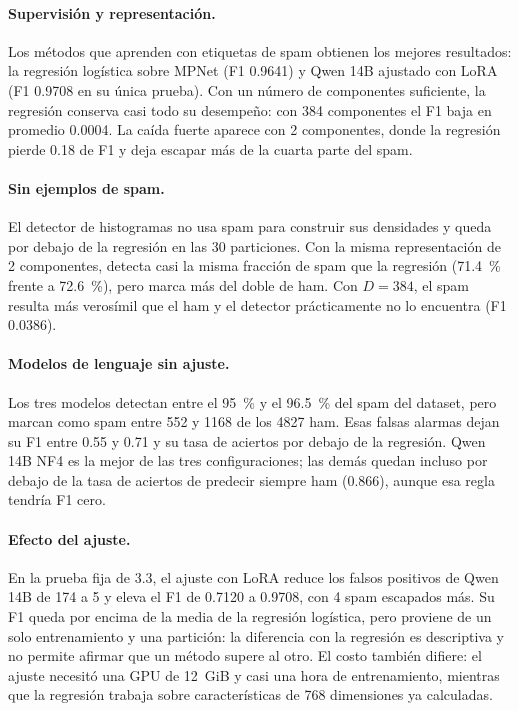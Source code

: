 \paragraph{Supervisión y representación.} Los métodos que aprenden con
etiquetas de spam obtienen los mejores resultados: la regresión logística
sobre MPNet (F1 0.9641) y Qwen 14B ajustado con LoRA (F1 0.9708 en su
única prueba). Con un número de componentes suficiente, la regresión
conserva casi todo su desempeño: con 384 componentes el F1 baja en
promedio 0.0004. La caída fuerte aparece con 2 componentes, donde la
regresión pierde 0.18 de F1 y deja escapar más de la cuarta parte del
spam.

\paragraph{Sin ejemplos de spam.} El detector de histogramas no usa spam
para construir sus densidades y queda por debajo de la regresión en las 30
particiones. Con la misma representación de 2 componentes, detecta casi la
misma fracción de spam que la regresión (71.4~\% frente a 72.6~\%), pero
marca más del doble de ham. Con $D=384$, el spam resulta más verosímil que
el ham y el detector prácticamente no lo encuentra (F1 0.0386).

\paragraph{Modelos de lenguaje sin ajuste.} Los tres modelos detectan entre
el 95~\% y el 96.5~\% del spam del dataset, pero marcan como spam entre 552
y 1168 de los 4827 ham. Esas falsas alarmas dejan su F1 entre 0.55 y 0.71 y
su tasa de aciertos por debajo de la regresión. Qwen 14B NF4 es la mejor de
las tres configuraciones; las demás quedan incluso por debajo de la tasa de
aciertos de predecir siempre ham (0.866), aunque esa regla tendría F1 cero.

\paragraph{Efecto del ajuste.} En la prueba fija de 3.3, el ajuste con LoRA
reduce los falsos positivos de Qwen 14B de 174 a 5 y eleva el F1 de 0.7120
a 0.9708, con 4 spam escapados más. Su F1 queda por encima de la media de la
regresión logística, pero proviene de un solo entrenamiento y una
partición: la diferencia con la regresión es descriptiva y no permite
afirmar que un método supere al otro. El costo también difiere: el ajuste
necesitó una GPU de 12~GiB y casi una hora de entrenamiento, mientras que
la regresión trabaja sobre características de 768 dimensiones ya
calculadas.
